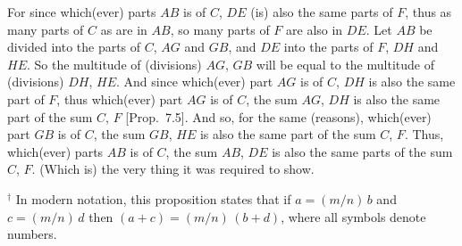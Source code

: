 \begin{Parallel}{}{}
{For since which(ever) parts $AB$ is of $C$, $DE$ (is) also the same parts  of $F$,
thus as many parts of $C$ as are in $AB$, so many 
 parts of $F$ are also in $DE$. Let $AB$ be divided into the parts of
$C$, $AG$ and $GB$, and $DE$ into the parts of $F$, $DH$ and $HE$. So the
multitude of (divisions) $AG$, $GB$ will be equal to the multitude
of (divisions) $DH$, $HE$. And since which(ever) part $AG$ is of $C$, $DH$ is
also the same part of $F$, thus which(ever) part $AG$ is of $C$, the sum $AG$, $DH$
is  also the same part of the sum $C$, $F$ [Prop.~7.5].  And so, for the same (reasons), 
which(ever) part $GB$ is of $C$, the sum $GB$, $HE$ is also
the same part of the sum $C$, $F$. Thus, which(ever) parts $AB$ is of $C$, the
sum $AB$, $DE$ is also the same parts of the sum $C$, $F$. (Which is)
the very thing it was required to show.}
\end{Parallel}
{\footnotesize\noindent$^\dag$ In modern notation,
this proposition states that if $a = (m/n)\,b$ and $c=(m/n)\,d$
then $(a+c) = (m/n)\,(b+d)$, where all symbols denote numbers.}

